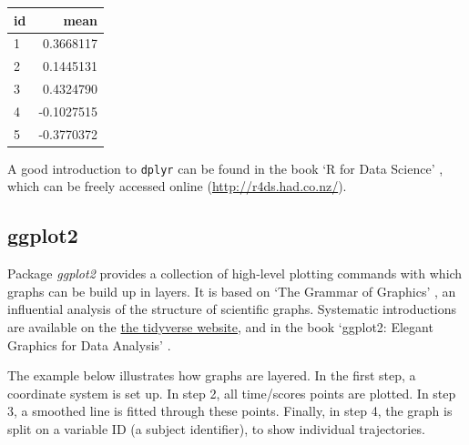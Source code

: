 \documentclass[]{book}
\begin{document}
\begin{tabular}{l|r}
\hline
id & mean\\
\hline
1 & 0.3668117\\
\hline
2 & 0.1445131\\
\hline
3 & 0.4324790\\
\hline
4 & -0.1027515\\
\hline
5 & -0.3770372\\
\hline
\end{tabular}

A good introduction to \texttt{dplyr} can be found in the book `R for
Data Science' \citep{wickham2016r}, which can be freely accessed online
(\url{http://r4ds.had.co.nz/}).

\subsection{ggplot2}\label{ggplot2}


Package \emph{ggplot2} \citep{wickham2016ggplot2} provides a collection
of high-level plotting commands with which graphs can be build up in
layers. It is based on `The Grammar of Graphics' \citep{wilkinson2006},
an influential analysis of the structure of scientific graphs.
Systematic introductions are available on the
\href{http://ggplot2.tidyverse.org/}{the tidyverse website}, and in the
book `ggplot2: Elegant Graphics for Data Analysis'
\citep{wickham2016ggplot2}.

The example below illustrates how graphs are layered. In the first step,
a coordinate system is set up. In step 2, all time/scores points are
plotted. In step 3, a smoothed line is fitted through these points.
Finally, in step 4, the graph is split on a variable ID (a subject
identifier), to show individual trajectories.
\end{document}
